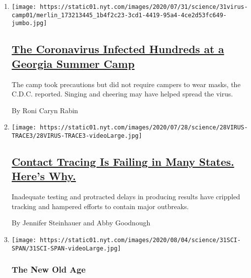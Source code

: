 \begin{enumerate}
\def\labelenumi{\arabic{enumi}.}
\item
  \texttt{[image: https://static01.nyt.com/images/2020/07/31/science/31virus-camp01/merlin\_173213445\_1b4f2c23-3cd1-4419-95a4-4ce2d53fc649-jumbo.jpg]}

  \hypertarget{the-coronavirus-infected-hundreds-at-a-georgia-summer-camp}{%
  \subsection{\texorpdfstring{\href{/2020/07/31/health/coronavirus-children-camp.html}{The
  Coronavirus Infected Hundreds at a Georgia Summer
  Camp}}{The Coronavirus Infected Hundreds at a Georgia Summer Camp}}\label{the-coronavirus-infected-hundreds-at-a-georgia-summer-camp}}

  The camp took precautions but did not require campers to wear masks,
  the C.D.C. reported. Singing and cheering may have helped spread the
  virus.

  By Roni Caryn Rabin
\item
  \texttt{[image: https://static01.nyt.com/images/2020/07/28/science/28VIRUS-TRACE3/28VIRUS-TRACE3-videoLarge.jpg]}

  \hypertarget{contact-tracing-is-failing-in-many-states-heres-why}{%
  \subsection{\texorpdfstring{\href{/2020/07/31/health/covid-contact-tracing-tests.html}{Contact
  Tracing Is Failing in Many States. Here's
  Why.}}{Contact Tracing Is Failing in Many States. Here's Why.}}\label{contact-tracing-is-failing-in-many-states-heres-why}}

  Inadequate testing and protracted delays in producing results have
  crippled tracking and hampered efforts to contain major outbreaks.

  By Jennifer Steinhauer and Abby Goodnough
\item
  \texttt{[image: https://static01.nyt.com/images/2020/08/04/science/31SCI-SPAN/31SCI-SPAN-videoLarge.jpg]}

  \hypertarget{the-new-old-age}{%
  \subsubsection{The New Old Age}\label{the-new-old-age}}

  \hypertarget{should-youth-come-first-in-coronavirus-care}{%
}
\end{enumerate}
